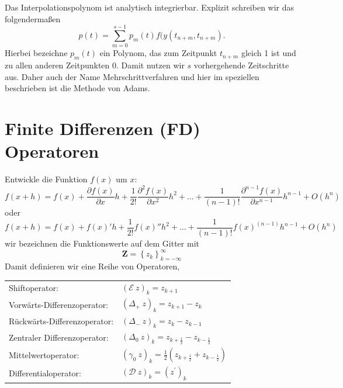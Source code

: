 Das Interpolationspolynom ist analytisch integrierbar.  Explizit schreiben wir
das folgendermaßen
\[ p(t)=\sum\limits_{m=0}^{s-1}p_m(t)f(y(t_{n+m},t_{n+m}). \]
Hierbei bezeichne $p_m(t)$ ein Polynom, das zum Zeitpunkt $t_{n+m}$ gleich 1
ist und zu allen anderen Zeitpunkten 0. Damit nutzen wir $s$ vorhergehende
Zeitschritte aus. Daher auch der Name Mehrschrittverfahren und hier im
speziellen beschrieben ist die Methode von Adams.
\section{Finite Differenzen (FD) Operatoren}
Entwickle die Funktion $f(x)$ um $x$:
\[ f(x+h)=f(x)+\frac{\partial f(x)}{\partial x}h+\frac{1}{2!}\frac{\partial^2
f(x)}{\partial x^2}h^2+\ldots+\frac{1}{(n-1)!}\frac{\partial^{n-1}
f(x)}{\partial x^ {n-1}}h^ {n-1} +O(h^n) \]
oder
\[f(x+h)=f(x)+ f(x)' h+\frac{1}{2!} f(x)'' h^2+\ldots+\frac{1}{(n-1)!} f(x)^{(n-1)} h^ {n-1} +O(h^n)\]
wir bezeichnen die Funktionswerte auf dem Gitter mit 
\[\mathbf{Z}=\left\{ z_k\right\}_{k=-\infty}^{\infty}\]
Damit definieren wir eine Reihe von Operatoren,

\begin{tabular}{ll}
Shiftoperator:&	$(\mathcal{E}\ z)_k=z_{k+1}$\\
Vorwärts-Differenzoperator:&	$(\Delta_+\ z)_k=z_{k+1}-z_{k}$\\
Rückwärts-Differenzoperator:&	$(\Delta_-\ z)_k=z_{k}-z_{k-1}$\\
Zentraler Differenzoperator:&	$(\Delta_0\ z)_k=z_{k+\frac{1}{2}}-z_{k-\frac{1}{2}}$\\
Mittelwertoperator:&	$(\gamma_0\ z)_k=\frac{1}{2}(z_{k+\frac{1}{2}}+z_{k-\frac{1}{2}})$\\
Differentialoperator:&	$(\mathcal{D}\ z)_k=(z^\prime)_k$
\end{tabular}

